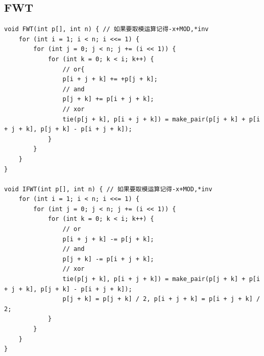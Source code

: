 \documentclass[twoside]{article}
\begin{document}
\subsection{FWT}
\begin{lstlisting}
void FWT(int p[], int n) { // 如果要取模运算记得-x+MOD,*inv
    for (int i = 1; i < n; i <<= 1) {
        for (int j = 0; j < n; j += (i << 1)) {
            for (int k = 0; k < i; k++) {
                // or{
                p[i + j + k] += +p[j + k];
                // and
                p[j + k] += p[i + j + k];
                // xor
                tie(p[j + k], p[i + j + k]) = make_pair(p[j + k] + p[i + j + k], p[j + k] - p[i + j + k]);
            }
        }
    }
}

void IFWT(int p[], int n) { // 如果要取模运算记得-x+MOD,*inv
    for (int i = 1; i < n; i <<= 1) {
        for (int j = 0; j < n; j += (i << 1)) {
            for (int k = 0; k < i; k++) {
                // or
                p[i + j + k] -= p[j + k];
                // and
                p[j + k] -= p[i + j + k];
                // xor
                tie(p[j + k], p[i + j + k]) = make_pair(p[j + k] + p[i + j + k], p[j + k] - p[i + j + k]);
                p[j + k] = p[j + k] / 2, p[i + j + k] = p[i + j + k] / 2;
            }
        }
    }
}\end{lstlisting}
\end{document}
